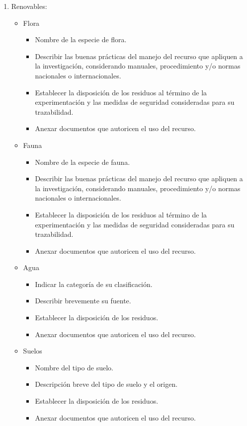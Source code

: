 \begin{enumerate}
	\item Renovables:
	\begin{itemize}
		\item Flora
		\begin{itemize}
			\item Nombre de la especie de flora.
			\item Describir las buenas prácticas del manejo del recurso que apliquen a la investigación, considerando manuales, procedimiento y/o normas nacionales o internacionales.
			\item Establecer la disposición de los residuos al término de la experimentación y las medidas de seguridad consideradas para su trazabilidad.
			\item Anexar documentos que autoricen el uso del recurso.
		\end{itemize}
		
		\item Fauna
		\begin{itemize}
			\item Nombre de la especie de fauna.
			\item Describir las buenas prácticas del manejo del recurso que apliquen a la investigación, considerando manuales, procedimiento y/o normas nacionales o internacionales.
			\item Establecer la disposición de los residuos al término de la experimentación y las medidas de seguridad consideradas para su trazabilidad.
			\item Anexar documentos que autoricen el uso del recurso.
		\end{itemize}			
		
		\item Agua
		\begin{itemize}
			\item Indicar la categoría de su clasificación.
			\item Describir brevemente su fuente.
			\item Establecer la disposición de los residuos.
			\item Anexar documentos que autoricen el uso del recurso.
		\end{itemize}
		
		\item Suelos
		\begin{itemize}
			\item Nombre del tipo de suelo.
			\item Descripción breve del tipo de suelo y el origen.
			\item Establecer la disposición de los residuos.
			\item Anexar documentos que autoricen el uso del recurso.
		\end{itemize}
		

\end{itemize}
\end{enumerate}
